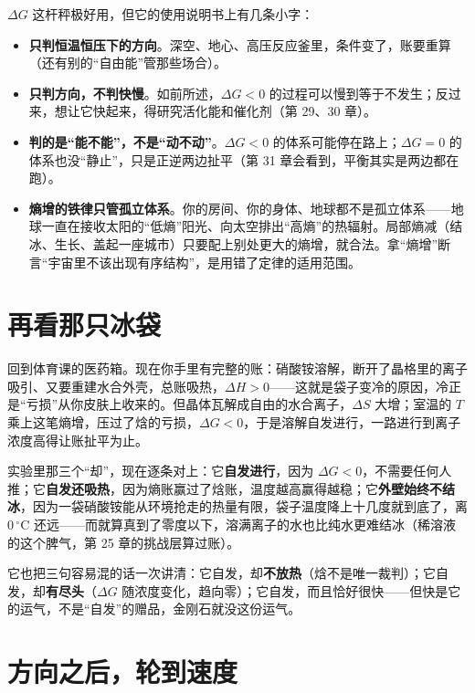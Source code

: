 $\Delta G$ 这杆秤极好用，但它的使用说明书上有几条小字：

\begin{itemize}[itemsep=2pt]
\item \textbf{只判恒温恒压下的方向}。深空、地心、高压反应釜里，条件变了，账要重算（还有别的“自由能”管那些场合）。
\item \textbf{只判方向，不判快慢}。如前所述，$\Delta G<0$ 的过程可以慢到等于不发生；反过来，想让它快起来，得研究活化能和催化剂（第 29、30 章）。
\item \textbf{判的是“能不能”，不是“动不动”}。$\Delta G<0$ 的体系可能停在路上；$\Delta G=0$ 的体系也没“静止”，只是正逆两边扯平（第 31 章会看到，平衡其实是两边都在跑）。
\item \textbf{熵增的铁律只管孤立体系}。你的房间、你的身体、地球都不是孤立体系——地球一直在接收太阳的“低熵”阳光、向太空排出“高熵”的热辐射。局部熵减（结冰、生长、盖起一座城市）只要配上别处更大的熵增，就合法。拿“熵增”断言“宇宙里不该出现有序结构”，是用错了定律的适用范围。
\end{itemize}

\section{再看那只冰袋}

回到体育课的医药箱。现在你手里有完整的账：硝酸铵溶解，断开了晶格里的离子吸引、又要重建水合外壳，总账吸热，$\Delta H>0$——这就是袋子变冷的原因，冷正是“亏损”从你皮肤上收来的。但晶体瓦解成自由的水合离子，$\Delta S$ 大增；室温的 $T$ 乘上这笔熵增，压过了焓的亏损，$\Delta G<0$，于是溶解自发进行，一路进行到离子浓度高得让账扯平为止。

实验里那三个“却”，现在逐条对上：它\textbf{自发进行}，因为 $\Delta G<0$，不需要任何人推；它\textbf{自发还吸热}，因为熵账赢过了焓账，温度越高赢得越稳；它\textbf{外壁始终不结冰}，因为一袋硝酸铵能从环境抢走的热量有限，袋子温度降上十几度就到底了，离 $0\,^{\circ}\mathrm{C}$ 还远——而就算真到了零度以下，溶满离子的水也比纯水更难结冰（稀溶液的这个脾气，第 25 章的挑战层算过账）。

它也把三句容易混的话一次讲清：它自发，却\textbf{不放热}（焓不是唯一裁判）；它自发，却\textbf{有尽头}（$\Delta G$ 随浓度变化，趋向零）；它自发，而且恰好很快——但快是它的运气，不是“自发”的赠品，金刚石就没这份运气。

\section{方向之后，轮到速度}

